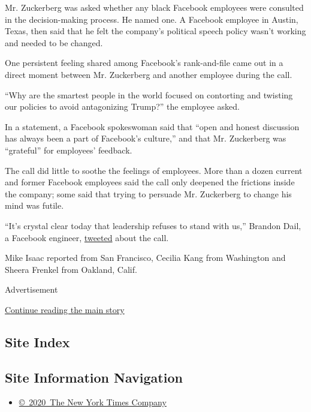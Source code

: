 Mr. Zuckerberg was asked whether any black Facebook employees were
consulted in the decision-making process. He named one. A Facebook
employee in Austin, Texas, then said that he felt the company's
political speech policy wasn't working and needed to be changed.

One persistent feeling shared among Facebook's rank-and-file came out in
a direct moment between Mr. Zuckerberg and another employee during the
call.

``Why are the smartest people in the world focused on contorting and
twisting our policies to avoid antagonizing Trump?'' the employee asked.

In a statement, a Facebook spokeswoman said that ``open and honest
discussion has always been a part of Facebook's culture,'' and that Mr.
Zuckerberg was ``grateful'' for employees' feedback.

The call did little to soothe the feelings of employees. More than a
dozen current and former Facebook employees said the call only deepened
the frictions inside the company; some said that trying to persuade Mr.
Zuckerberg to change his mind was futile.

``It's crystal clear today that leadership refuses to stand with us,''
Brandon Dail, a Facebook engineer,
\href{https://twitter.com/aweary/status/1267885674805354498}{tweeted}
about the call.

Mike Isaac reported from San Francisco, Cecilia Kang from Washington and
Sheera Frenkel from Oakland, Calif.

Advertisement

\protect\hyperlink{after-bottom}{Continue reading the main story}

\hypertarget{site-index}{%
\subsection{Site Index}\label{site-index}}

\hypertarget{site-information-navigation}{%
\subsection{Site Information
Navigation}\label{site-information-navigation}}

\begin{itemize}
\tightlist
\item
  \href{https://help.nytimes.com/hc/en-us/articles/115014792127-Copyright-notice}{©~2020~The
  New York Times Company}
\end{itemize}

